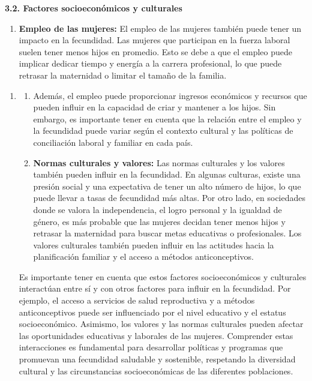 \documentclass[8pt,a4paper]{beamer}
\begin{document}
{\begin{frame}{}
\begin{block}{\textbf{3.2. Factores socioeconómicos y culturales}}
\begin{enumerate}
\begin{enumerate}
\item[\ding{65}] \textbf{Empleo de las mujeres:} El empleo de las mujeres también puede tener un impacto en la fecundidad. Las mujeres que participan en la fuerza laboral suelen tener menos hijos en promedio. Esto se debe a que el empleo puede implicar dedicar tiempo y energía a la carrera profesional, lo que puede retrasar la maternidad o limitar el tamaño de la familia. 
\end{enumerate}
\end{enumerate}
\end{block}
\end{frame}


\begin{frame}{}
\begin{block}{}
\justifying
\begin{enumerate}
\setlength{\parskip}{3px}
\justifying
\item[{}] 
\begin{enumerate}
\setlength{\parskip}{3px}
\justifying
\item[{}] Además, el empleo puede proporcionar ingresos económicos y recursos que pueden influir en la capacidad de criar y mantener a los hijos. Sin embargo, es importante tener en cuenta que la relación entre el empleo y la fecundidad puede variar según el contexto cultural y las políticas de conciliación laboral y familiar en cada país.

\item[\ding{65}]  \textbf{Normas culturales y valores:} Las normas culturales y los valores también pueden influir en la fecundidad. En algunas culturas, existe una presión social y una expectativa de tener un alto número de hijos, lo que puede llevar a tasas de fecundidad más altas. Por otro lado, en sociedades donde se valora la independencia, el logro personal y la igualdad de género, es más probable que las mujeres decidan tener menos hijos y retrasar la maternidad para buscar metas educativas o profesionales. Los valores culturales también pueden influir en las actitudes hacia la planificación familiar y el acceso a métodos anticonceptivos.

\end{enumerate}
Es importante tener en cuenta que estos factores socioeconómicos y culturales interactúan entre sí y con otros factores para influir en la fecundidad. Por ejemplo, el acceso a servicios de salud reproductiva y a métodos anticonceptivos puede ser influenciado por el nivel educativo y el estatus socioeconómico. Asimismo, los valores y las normas culturales pueden afectar las oportunidades educativas y laborales de las mujeres. Comprender estas interacciones es fundamental para desarrollar políticas y programas que promuevan una fecundidad saludable y sostenible, respetando la diversidad cultural y las circunstancias socioeconómicas de las diferentes poblaciones.
\end{enumerate}
\end{block}
\end{frame}

}
\end{document}
